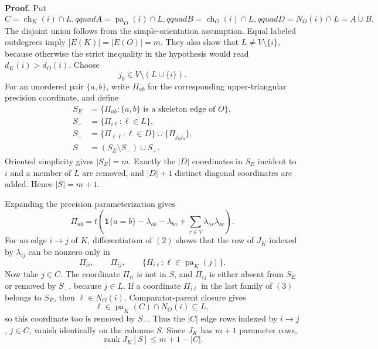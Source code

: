 \textbf{Proof.}
Put
\[
 C=\operatorname{ch}_K(i)\cap L,qquad
 A=\operatorname{pa}_O(i)\cap L,qquad
 B=\operatorname{ch}_O(i)\cap L,qquad
 D=N_O(i)\cap L=A\mathbin{\dot\cup}B.
\]
The disjoint union follows from the simple-orientation assumption.  Equal labeled outdegrees imply \(|E(K)|=|E(O)|=m\).  They also show that \(L\ne V\setminus\{i\}\), because otherwise the strict inequality in the hypothesis would read \(d_K(i)>d_O(i)\).  Choose
\[
 j_0\in V\setminus(L\cup\{i\}).
\]
For an unordered pair \(\{a,b\}\), write \(\Pi_{ab}\) for the corresponding upper-triangular precision coordinate, and define
\[
 \begin{aligned}
 S_E&=\{\Pi_{ab}:\{a,b\}\text{ is a skeleton edge of }O\},\\
 S_-&=\{\Pi_{i\ell}:\ell\in L\},\\
 S_+&=\{\Pi_{\ell\ell}:\ell\in D\}\cup\{\Pi_{j_0j_0}\},\\
 S&=(S_E\setminus S_-)\cup S_+.
 \end{aligned}
 \tag{1}
\]
Oriented simplicity gives \(|S_E|=m\).  Exactly the \(|D|\) coordinates in \(S_E\) incident to \(i\) and a member of \(L\) are removed, and \(|D|+1\) distinct diagonal coordinates are added.  Hence \(|S|=m+1\).

Expanding the precision parameterization gives
\[
 \Pi_{ab}=t\left(\mathbf 1\{a=b\}-\lambda_{ab}-\lambda_{ba}
 +\sum_{r\in V}\lambda_{ar}\lambda_{br}\right).
 \tag{2}
\]
For an edge \(i\to j\) of \(K\), differentiation of \((2)\) shows that the row of \(J_K\) indexed by \(\lambda_{ij}\) can be nonzero only in
\[
 \Pi_{ii},\qquad \Pi_{ij},\qquad
 \{\Pi_{i\ell}:\ell\in\operatorname{pa}_K(j)\}.
 \tag{3}
\]
Now take \(j\in C\).  The coordinate \(\Pi_{ii}\) is not in \(S\), and \(\Pi_{ij}\) is either absent from \(S_E\) or removed by \(S_-\), because \(j\in L\).  If a coordinate \(\Pi_{i\ell}\) in the last family of \((3)\) belongs to \(S_E\), then \(\ell\in N_O(i)\).  Comparator-parent closure gives
\[
 \ell\in\operatorname{pa}_K(C)\cap N_O(i)\subseteq L,
\]
so this coordinate too is removed by \(S_-\).  Thus the \(|C|\) edge rows indexed by \(i\to j\), \(j\in C\), vanish identically on the columns \(S\).  Since \(J_K\) has \(m+1\) parameter rows,
\[
 \operatorname{rank}J_K[S]\le m+1-|C|.
 \tag{4}
\]

